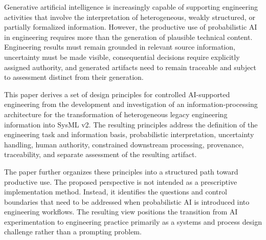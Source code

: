 Generative artificial intelligence is increasingly capable of supporting engineering
activities that involve the interpretation of heterogeneous, weakly structured, or
partially formalized information. However, the productive use of probabilistic AI in
engineering requires more than the generation of plausible technical content. Engineering
results must remain grounded in relevant source information, uncertainty must be made
visible, consequential decisions require explicitly assigned authority, and generated
artifacts need to remain traceable and subject to assessment distinct from their generation.

This paper derives a set of design principles for controlled AI-supported engineering
from the development and investigation of an information-processing architecture for
the transformation of heterogeneous legacy engineering information into SysML v2.
The resulting principles address the definition of the engineering task and information
basis, probabilistic interpretation, uncertainty handling, human authority, constrained
downstream processing, provenance, traceability, and separate assessment of the resulting artifact.

The paper further organizes these principles into a structured path toward productive use.
The proposed perspective is not intended as a prescriptive implementation method.
Instead, it identifies the questions and control boundaries that need to be addressed when
probabilistic AI is introduced into engineering workflows. The resulting view positions the
transition from AI experimentation to engineering practice primarily as a systems and
process design challenge rather than a prompting problem.
